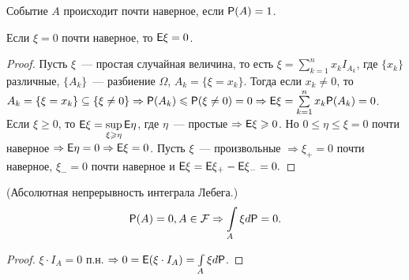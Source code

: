 \begin{definition}
	Событие $A$ происходит почти наверное, если $\P(A) = 1$.
\end{definition}

\begin{property}
	Если $\xi = 0$ почти наверное, то $\E\xi = 0$.
	\begin{proof}
		Пусть $\xi$~--- простая случайная величина, то есть $\xi = \sum\limits_{k = 1}^nx_kI_{A_k}$, где $\{x_k\}$ различные, $\{A_k\}$~--- разбиение $\Omega$, $A_k = \{\xi = x_k\}$. Тогда если $x_k \neq 0$, то $A_k = \{\xi = x_k\} \subseteq \{\xi \neq 0\} \Rightarrow \P(A_k) \leqslant \P(\xi \neq 0) = 0 \Rightarrow \E\xi = \sum\limits_{k = 1}^n x_k\P(A_k) = 0$. Если $\xi \geqslant 0$, то $\E\xi = \sup\limits_{\xi \geqslant \eta} \E\eta$, где $\eta$~--- простые $\Rightarrow \E\xi \geqslant 0$. Но $0 \leqslant \eta \leqslant \xi = 0$ почти наверное $\Rightarrow \E\eta = 0 \Rightarrow \E\xi = 0$. Пусть $\xi$~--- произвольные $\Rightarrow \xi_+ = 0$ почти наверное, $\xi_- = 0$ почти наверное и $\E\xi = \E\xi_+ - \E\xi_- = 0.$
	\end{proof} 
\end{property}


\begin{consequence} (Абсолютная непрерывность интеграла Лебега.)
    $$ \P(A) = 0, A \in \F \Rightarrow \int\limits_{A} \xi d\P = 0. $$
    \begin{proof}
        $\xi \cdot I_A = 0$ п.н. $\Rightarrow 0 = \E(\xi \cdot I_A) = \int\limits_A\xi d\P$.
    \end{proof}
\end{consequence}